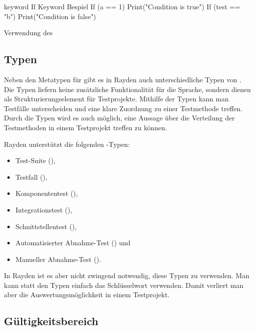 \begin{program}
\begin{JavaCode}
keyword If Keyword Bespiel {
	If (a == 1) {
		Print("Condition is true")
	}
	If (test == "b") {
		Print("Condition is false")
	}
}
\end{JavaCode}
\caption{Verwendung des }
\label{prog:ifKeywordUsage}
\end{program}

\subsection{Typen}
\label{cha:KeywordTypes}

Neben den Metatypen für  gibt es in Rayden auch unterschiedliche Typen von . Die Typen liefern keine zusätzliche Funktionalität für die Sprache, sondern dienen als Strukturierungselement für Testprojekte. Mithilfe der Typen kann man Testfälle unterscheiden und eine klare Zuordnung zu einer Testmethode treffen. Durch die Typen wird es auch möglich, eine Aussage über die Verteilung der Testmethoden in einem Testprojekt treffen zu können. 

\SuperPar
Rayden unterstützt die folgenden -Typen:

\begin{itemize}
\item Test-Suite (),
\item Testfall (),
\item Komponententest (),
\item Integrationstest (),
\item Schnittstellentest (),
\item Automatisierter Abnahme-Test () und
\item Manueller Abnahme-Test ().
\end{itemize}

\SuperPar
In Rayden ist es aber nicht zwingend notwendig, diese Typen zu verwenden. Man kann statt den Typen einfach das Schlüsselwort  verwenden. Damit verliert man aber die Auswertungsmöglichkeit in einem Testprojekt. 

\subsection{Gültigkeitsbereich}
\label{cha:KeywordScope}

